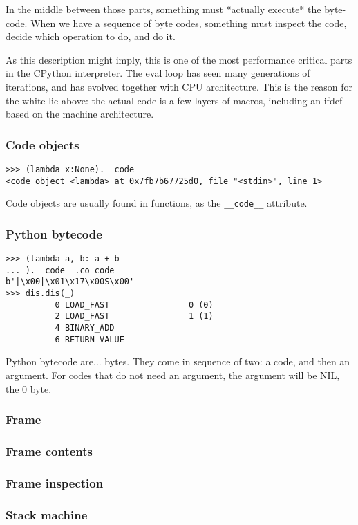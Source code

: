 In the middle between those parts,
something must
*actually execute*
the byte-code.
When we have a sequence of byte codes,
something must inspect the code,
decide which operation to do,
and do it.

As this description might imply,
this is one of the most performance critical parts
in the CPython interpreter.
The eval loop has seen many generations of iterations,
and has evolved together with CPU architecture.
This is the reason for the white lie above:
the actual code is a few layers of macros,
including an ifdef based on the machine architecture.


\begin{frame}[fragile]
\frametitle{Code objects}

\begin{lstlisting}
>>> (lambda x:None).__code__
<code object <lambda> at 0x7fb7b67725d0, file "<stdin>", line 1>
\end{lstlisting}

\end{frame}

Code objects are usually found in functions,
as the \verb|__code__| attribute.

\begin{frame}
\frametitle{Python bytecode}

\begin{lstlisting}
>>> (lambda a, b: a + b
... ).__code__.co_code
b'|\x00|\x01\x17\x00S\x00'
>>> dis.dis(_)
          0 LOAD_FAST                0 (0)
          2 LOAD_FAST                1 (1)
          4 BINARY_ADD
          6 RETURN_VALUE
\end{lstlisting}

\end{frame}

Python bytecode are...
bytes.
They come in sequence of two:
a code,
and then an argument.
For codes that do not need an argument,
the argument will be NIL,
the 0 byte.

\begin{frame}
\frametitle{Frame}
\end{frame}

\begin{frame}
\frametitle{Frame contents}
\end{frame}

\begin{frame}
\frametitle{Frame inspection}
\end{frame}

\begin{frame}
\frametitle{Stack machine}
\end{frame}

